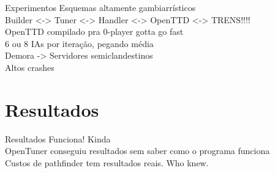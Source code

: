 \documentclass[10pt]{beamer}
\begin{document}
\begin{frame}{Experimentos}
	Esquemas altamente gambiarrísticos \pause\\
	Builder <-> Tuner <-> Handler <-> OpenTTD <-> TRENS!!!!\pause\\
	OpenTTD compilado pra 0-player gotta go fast\pause\\
	6 ou 8 IAs por iteração, pegando média\pause\\
	Demora \pause -> Servidores semiclandestinos\pause\\
	Altos crashes
\end{frame}

\section{Resultados}

\begin{frame}{Resultados}
	Funciona! \pause Kinda\pause\\
	OpenTuner conseguiu resultados sem saber como o programa funciona\pause \\
	Custos de pathfinder tem resultados reais. Who knew.
\end{frame}
\end{document}
